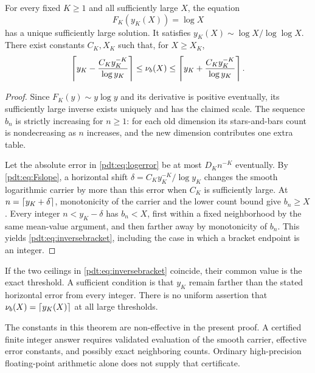 \begin{theorem}\label{pdt:thm:inverse}
For every fixed $K\ge1$ and all sufficiently large $X$, the equation
\begin{equation}\label{pdt:eq:inverse-equation}
 F_K(y_K(X))=\log X
\end{equation}
has a unique sufficiently large solution. It satisfies
$y_K(X)\sim\log X/\log\log X$. There exist constants $C_K,X_K$ such that, for $X\ge X_K$,
\begin{equation}\label{pdt:eq:inversebracket}
 \left\lceil y_K-\frac{C_Ky_K^{-K}}{\log y_K}\right\rceil
 \le\nu_b(X)\le
 \left\lceil y_K+\frac{C_Ky_K^{-K}}{\log y_K}\right\rceil.
\end{equation}
\end{theorem}
\begin{proof}
Since $F_K(y)\sim y\log y$ and its derivative is positive eventually, its sufficiently large inverse exists uniquely and has the claimed scale. The sequence $b_n$ is strictly increasing for $n\ge1$: for each old dimension its stars-and-bars count is nondecreasing as $n$ increases, and the new dimension contributes one extra table.

Let the absolute error in \eqref{pdt:eq:logerror} be at most $D_Kn^{-K}$ eventually. By \eqref{pdt:eq:Fslope}, a horizontal shift
$\delta=C_Ky_K^{-K}/\log y_K$ changes the smooth logarithmic carrier by more than this error when $C_K$ is sufficiently large. At $n=\left\lceil y_K+\delta\right\rceil$, monotonicity of the carrier and the lower count bound give $b_n\ge X$. Every integer $n<y_K-\delta$ has $b_n<X$, first within a fixed neighborhood by the same mean-value argument, and then farther away by monotonicity of $b_n$. This yields \eqref{pdt:eq:inversebracket}, including the case in which a bracket endpoint is an integer.
\end{proof}
If the two ceilings in \eqref{pdt:eq:inversebracket} coincide, their common value is the exact threshold. A sufficient condition is that $y_K$ remain farther than the stated horizontal error from every integer. There is no uniform assertion that $\nu_b(X)=\left\lceil y_K(X)\right\rceil$ at all large thresholds.

The constants in this theorem are non-effective in the present proof. A certified finite integer answer requires validated evaluation of the smooth carrier, effective error constants, and possibly exact neighboring counts. Ordinary high-precision floating-point arithmetic alone does not supply that certificate.

